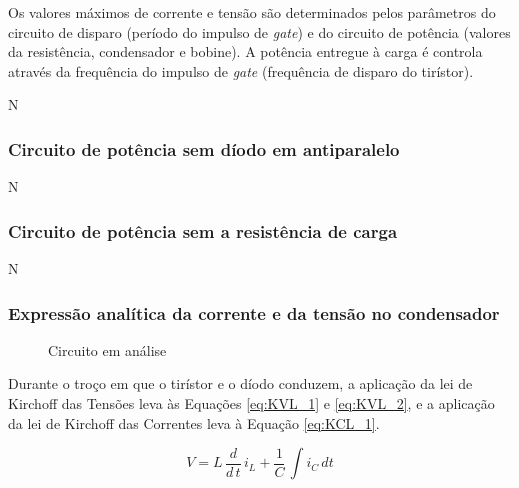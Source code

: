 \documentclass[a4paper,11pt]{article}
\numberwithin{equation}{section}
\begin{document}
	Os valores máximos de corrente e tensão são determinados pelos parâmetros do circuito de disparo (período do impulso de \textit{gate}) e do circuito de potência (valores da resistência, condensador e bobine).
	A potência entregue à carga é controla através da frequência  do impulso de \textit{gate} (frequência de disparo do tirístor).




N

\subsubsection{Circuito de potência sem díodo em antiparalelo}

N

\subsubsection{Circuito de potência sem a resistência de carga}

N

\subsubsection{Expressão analítica da corrente e da tensão no condensador}


	\begin{figure}[h]
		\centering

		\caption{Circuito em análise}
		\label{fig:circuit_e18}
	\end{figure}

Durante o troço em que o tirístor e o díodo conduzem, a aplicação da lei de Kirchoff das Tensões leva às Equações \ref{eq:KVL_1} e \ref{eq:KVL_2}, e a aplicação da lei de Kirchoff das Correntes leva à Equação \ref{eq:KCL_1}.

\begin{equation}
\label{eq:KVL_1}
V = L\,\frac{d}{d\,t}\,i_L + \frac{1}{C}\,\int i_C\,dt
\end{equation}
\end{document}
